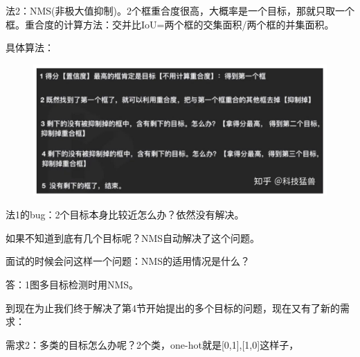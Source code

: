 \documentclass[12pt]{article}
\begin{document}
法2：NMS(非极大值抑制)。2个框重合度很高，大概率是一个目标，那就只取一个框。重合度的计算方法：交并比IoU=两个框的交集面积/两个框的并集面积。

具体算法：
\begin{figure}[H]
    \centering
    \includegraphics[width=1\textwidth]{fig/Yolo_Series_3.png}
\end{figure}

法1的bug：2个目标本身比较近怎么办？依然没有解决。

如果不知道到底有几个目标呢？NMS自动解决了这个问题。

面试的时候会问这样一个问题：NMS的适用情况是什么？

答：1图多目标检测时用NMS。

到现在为止我们终于解决了第4节开始提出的多个目标的问题，现在又有了新的需求：

需求2：多类的目标怎么办呢？2个类，one-hot就是[0,1],[1,0]这样子，





\end{document}
